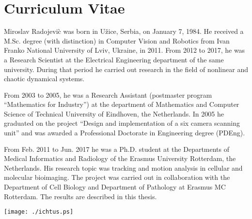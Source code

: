 %
%

\noquote
\orgchpos
\chapter*{Curriculum Vitae}

\noindent
Miroslav Radojevi\`{c} was born in U\v{z}ice, Serbia, on January 7, 1984. He received a M.Sc. degree (with distinction) in Computer Vision and Robotics from Ivan Franko National University of Lviv, Ukraine, in 2011. From 2012 to 2017, he
was a Research Scientist at the Electrical Engineering department of the same university. During that period he carried out research in the field of nonlinear and chaotic dynamical systems. 

\bigskip
\noindent
From 2003 to 2005, he was a Research Assistant (postmaster program
``Mathematics for Industry'') at the department of Mathematics and
Computer Science of Technical University of Eindhoven, the
Netherlands. In 2005 he graduated on the project ``Design and
implementation of a six camera scanning unit'' and was awarded a
Professional Doctorate in Engineering degree (PDEng). 

\bigskip
\noindent
From Feb. 2011 to Jun. 2017 he was a Ph.D. student at the Departments of Medical Informatics and Radiology of the Erasmus University Rotterdam,
the Netherlands. His research topic was tracking and motion analysis
in cellular and molecular bioimaging. The project was carried out in collaboration with
the Department of Cell Biology and Department of Pathology at Erasmus
MC Rotterdam. The results are described in this thesis.



\newpage
\thispagestyle{empty}
\vspace*{8cm}
\begin{center}
  \texttt{[image: ./ichtus.ps]}
\end{center}


